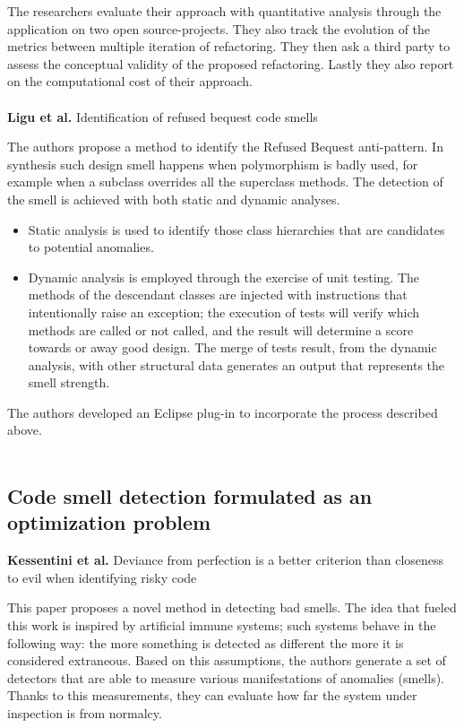 The researchers evaluate their approach with quantitative analysis through the application on two open source-projects. They also track the evolution of the metrics between multiple iteration of refactoring.
They then ask a third party to assess the conceptual validity of the proposed refactoring.
Lastly they also report on the computational cost of their approach.
\\
\\
\textbf{Ligu et al.} \cite{ligu2013identification} Identification of refused bequest code smells

The authors propose a method to identify the Refused Bequest anti-pattern. In synthesis such design smell happens when polymorphism is badly used, for example when a subclass overrides all the superclass methods.
The detection of the smell is achieved with both static and dynamic analyses.
\begin{itemize}
    \item Static analysis is used to identify those class hierarchies that are candidates to potential anomalies.
    \item Dynamic analysis is employed through the exercise of unit testing. The methods of the descendant classes are injected with instructions that intentionally raise an exception; the execution of tests will verify which methods are called or not called, and the result will determine a score towards or away good design. The merge of tests result, from the dynamic analysis, with other structural data generates an output that represents the smell strength.
\end{itemize}
The authors developed an Eclipse plug-in to incorporate the process described above.
\\
\\
\subsection{Code smell detection formulated as an optimization problem}
\textbf{Kessentini et al.} \cite{kessentini2010deviance} Deviance from perfection is a better criterion than closeness to evil when identifying risky code

This paper proposes a novel method in detecting bad smells. The idea that fueled this work is inspired by artificial immune systems; such systems behave in the following way: the more something is detected as different the more it is considered extraneous.
Based on this assumptions, the authors generate a set of detectors that are able to measure various manifestations of anomalies (smells). Thanks to this measurements, they can evaluate how far the system under inspection is from normalcy. 

